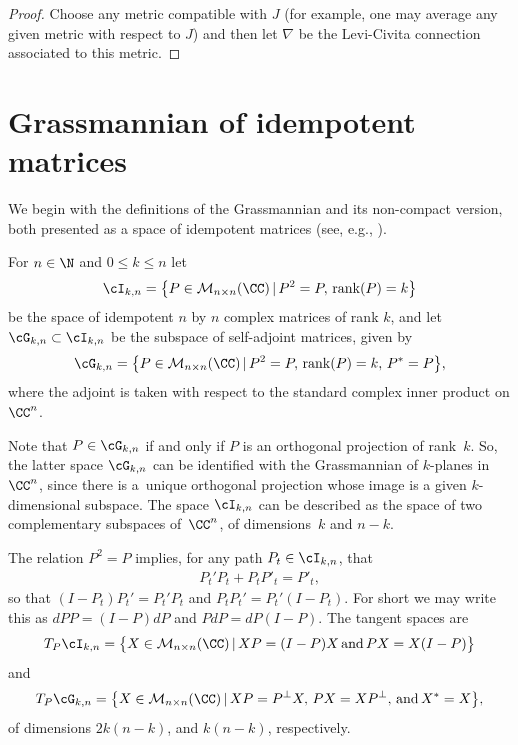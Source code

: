 \begin{proof}Choose any metric compatible with $J$ (for example, one may average any given metric with respect to $J$) and then let $\nabla$ be the Levi-Civita connection associated to this metric.
\end{proof}

\section{Grassmannian of idempotent matrices} \label{sec;grass}

We begin with the definitions of the Grassmannian and its non-compact version, both presented as a space of idempotent matrices (see, e.g., \cite[Problem~5-C]{MS}).

\begin{defn}For $n \in \N$ and $0 \leq k \leq n$ let
\begin{gather*}
\cI_{k,n} = \big\{ P \in \mathcal{M}_{n \times n}(\CC) \,| \, P^2 = P, \, \operatorname{rank}(P) = k \big\}
\end{gather*}
be the space of idempotent $n$ by $n$ complex matrices of rank $k$, and let $ \cG_{k,n} \subset \cI_{k,n}$ be the subspace of self-adjoint matrices, given by
\begin{gather*}
\cG_{k,n} = \big\{ P \in \mathcal{M}_{n \times n}(\CC)\, | \, P^2 = P ,\, \operatorname{rank}(P) = k, \, P^* = P \big\},
\end{gather*}
where the adjoint is taken with respect to the standard complex inner product on $\CC^n$.
\end{defn}

Note that $P \in \cG_{k,n}$ if and only if $P$ is an orthogonal projection of rank~$k$. So, the latter space $\cG_{k,n}$ can be identified with the Grassmannian of $k$-planes in $\CC^n$, since there is a~unique orthogonal projection whose image is a given $k$-dimensional subspace. The space $\cI_{k,n}$ can be described as the space of two complementary subspaces of~$\CC^n$, of dimensions~$k$ and $n-k$.

The relation $P^2 = P$ implies, for any path $P_t \in \cI_{k,n}$, that
\begin{gather*}
P_t' P_t + P_t P'_t = P'_t,
\end{gather*}
so that $(I-P_t)P_t' = P_t'P_t$ and $P_t P_t' = P_t' (I-P_t)$. For short we may write this as $dPP= (I-P)dP$ and $P dP= dP (I-P)$. The tangent spaces are
\begin{gather*}
T_P\cI_{k,n} = \big\{ X \in \mathcal{M}_{n \times n}(\CC)\, |\, XP= (I-P)X \, \textrm{and} \, PX= X(I-P) \big\}
\end{gather*}
and
\begin{gather*}
T_P \cG_{k,n} = \big\{ X \in \mathcal{M}_{n \times n}(\CC) \,| \, XP = P^\perp X, \, PX= X P^\perp , \, \textrm{and} \, X^*=X \big\},
\end{gather*}
of dimensions $2k(n-k)$, and $k(n-k)$, respectively.

